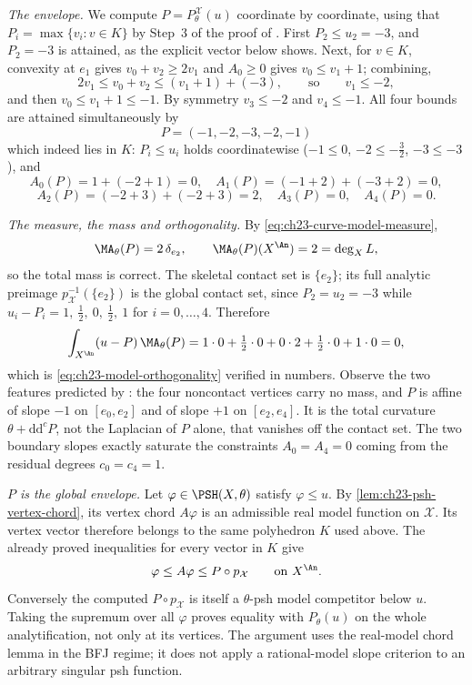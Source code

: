 \begin{example}
\emph{The envelope.}  We compute \(P=P^{\mathcal X}_\theta(u)\) coordinate
by coordinate, using that \(P_i=\max\{v_i:v\in K\}\) by Step~3 of the proof
of .  First \(P_2\leq u_2=-3\), and
\(P_2=-3\) is attained, as the explicit vector below shows.  Next, for
\(v\in K\), convexity at \(e_1\) gives \(v_0+v_2\geq2v_1\) and \(A_0\geq0\)
gives \(v_0\leq v_1+1\); combining,
\[
 2v_1\leq v_0+v_2\leq (v_1+1)+(-3),
 \qquad\text{so}\qquad v_1\leq-2 ,
\]
and then \(v_0\leq v_1+1\leq-1\).  By symmetry \(v_3\leq-2\) and
\(v_4\leq-1\).  All four bounds are attained simultaneously by
\[
 \boxed{\ P=(-1,-2,-3,-2,-1)\ }
\]
which indeed lies in \(K\): \(P_i\leq u_i\) holds coordinatewise
(\(-1\leq0\), \(-2\leq-\tfrac32\), \(-3\leq-3\)), and
\[
 A_0(P)=1+(-2+1)=0,\quad
 A_1(P)=(-1+2)+(-3+2)=0,
\]
\[
 A_2(P)=(-2+3)+(-2+3)=2,\quad
 A_3(P)=0,\quad
 A_4(P)=0 .
\]

\emph{The measure, the mass and orthogonality.}  By
\eqref{eq:ch23-curve-model-measure},
\[
 \MA_\theta(P)=2\,\delta_{e_2},
 \qquad
 \MA_\theta(P)(X^{\An})=2=\deg_XL ,
\]
so the total mass is correct.  The skeletal contact set is \(\{e_2\}\); its full analytic preimage
\(p_{\mathcal X}^{-1}(\{e_2\})\) is the global contact set, since
\(P_2=u_2=-3\) while \(u_i-P_i=1,\ \tfrac12,\ 0,\ \tfrac12,\ 1\) for
\(i=0,\ldots,4\).  Therefore
\[
 \int_{X^{\An}}(u-P)\,\MA_\theta(P)
 =1\cdot0+\tfrac12\cdot0+0\cdot2+\tfrac12\cdot0+1\cdot0=0 ,
\]
which is \eqref{eq:ch23-model-orthogonality} verified in numbers.  Observe
the two features predicted by
: the four noncontact vertices
carry no mass, and \(P\) is affine of slope \(-1\) on \([e_0,e_2]\) and of
slope \(+1\) on \([e_2,e_4]\).  It is the total curvature
\(\theta+\mathrm d\mathrm d^cP\), not the Laplacian of \(P\) alone,
that vanishes off the contact set.  The two boundary slopes exactly saturate the constraints
\(A_0=A_4=0\) coming from the residual degrees \(c_0=c_4=1\).

\emph{\(P\) is the global envelope.}
Let \(\varphi\in\PSH(X,\theta)\) satisfy \(\varphi\leq u\).
By \cref{lem:ch23-psh-vertex-chord}, its vertex chord
\(A\varphi\) is an admissible real model function on
\(\mathcal X\).  Its vertex vector therefore belongs to the same
polyhedron \(K\) used above.  The already proved inequalities for
every vector in \(K\) give
\[
            \varphi\leq A\varphi\leq P\circ p_{\mathcal X}
            \qquad\text{on }X^{\An}.
\]
Conversely the computed \(P\circ p_{\mathcal X}\) is itself a
\(\theta\)-psh model competitor below \(u\).  Taking the supremum
over all \(\varphi\) proves equality with \(P_\theta(u)\) on the
whole analytification, not only at its vertices.  The argument uses
the real-model chord lemma in the BFJ regime; it does not apply a
rational-model slope criterion to an arbitrary singular psh function.


\end{example}

